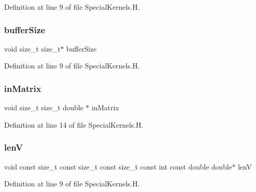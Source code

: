 Definition at line 9 of file Special\+Kernels.\+H.

\hypertarget{SpecialKernels_8H_aa9426cdf16e85054db35e88f9b68c6be}{}\label{SpecialKernels_8H_aa9426cdf16e85054db35e88f9b68c6be} 
\subsubsection{\texorpdfstring{buffer\+Size}{bufferSize}}
{\footnotesize\ttfamily void size\+\_\+t size\+\_\+t$\ast$ buffer\+Size}



Definition at line 9 of file Special\+Kernels.\+H.

\hypertarget{SpecialKernels_8H_aacec8fb16540ff8822123643cc0a8ac7}{}\label{SpecialKernels_8H_aacec8fb16540ff8822123643cc0a8ac7} 
\subsubsection{\texorpdfstring{in\+Matrix}{inMatrix}}
{\footnotesize\ttfamily void size\+\_\+t size\+\_\+t double $\ast$ in\+Matrix}



Definition at line 14 of file Special\+Kernels.\+H.

\hypertarget{SpecialKernels_8H_ae57c6618bb10bce0dd369e9611a363e2}{}\label{SpecialKernels_8H_ae57c6618bb10bce0dd369e9611a363e2} 
\subsubsection{\texorpdfstring{lenV}{lenV}}
{\footnotesize\ttfamily void const size\+\_\+t const size\+\_\+t const size\+\_\+t const int const double double$\ast$ lenV}



Definition at line 9 of file Special\+Kernels.\+H.

\hypertarget{SpecialKernels_8H_a78525fd0fb580fe08dba21a167ba4ac1}{}\label{SpecialKernels_8H_a78525fd0fb580fe08dba21a167ba4ac1} 
